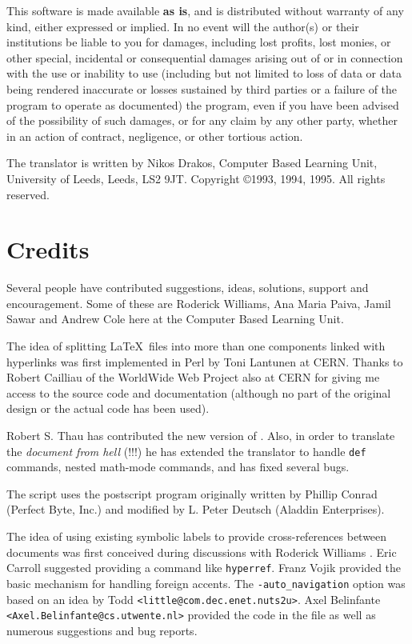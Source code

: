 This software is made available \textbf{as is}, and is distributed without 
warranty of any kind, either expressed or implied.
In no event will the author(s) or their institutions be liable to you
for damages, including lost profits, lost monies, or other special,
incidental or consequential damages arising out of or in connection
with the use or inability to use (including but not limited to loss of
data or data being rendered inaccurate or losses sustained by third
parties or a failure of the program to operate as documented) the 
program, even if you have been advised of the possibility of such
damages, or for any claim by any other party, whether in an action of
contract, negligence, or other tortious action.

The \latextohtml{} translator is written by Nikos Drakos, 
Computer Based Learning Unit,  University of Leeds,  Leeds,  LS2 9JT.
Copyright \copyright 1993, 1994, 1995. All rights reserved.
 
\section{Credits}
Several people have contributed suggestions, ideas, solutions, support
and encouragement. Some of these are Roderick Williams, Ana Maria
Paiva, Jamil Sawar and Andrew Cole here at the Computer Based Learning Unit.

The idea of splitting \LaTeX\  files
into more than one components linked with hyperlinks was first
implemented in Perl by Toni Lantunen at CERN.
Thanks to Robert Cailliau 
of the WorldWide Web Project also at CERN 
for giving me access to the source code and documentation (although no
part of the original design or the actual code has been used).

Robert S. Thau  has contributed the new version of
. Also, in order to translate the \emph{document 
from hell} (!!!) he has extended the translator to handle \texttt{def}
commands, nested math-mode commands, and has fixed several bugs.

The  script 
uses the  postscript program originally written by
Phillip Conrad (Perfect Byte, Inc.) and modified by L. Peter Deutsch 
(Aladdin Enterprises).

The idea of using existing symbolic labels to provide cross-references
between documents was first conceived during discussions with 
Roderick Williams .
Eric Carroll  suggested providing
a command like \texttt{hyperref}. Franz Vojik
provided the basic mechanism for handling foreign accents.
The \texttt{-auto\_navigation} option was based on an idea by
Todd \texttt{<little@com.dec.enet.nuts2u>}.
Axel Belinfante \texttt{<Axel.Belinfante@cs.utwente.nl>} provided the
code in the  file as well as numerous suggestions
and bug reports. 

